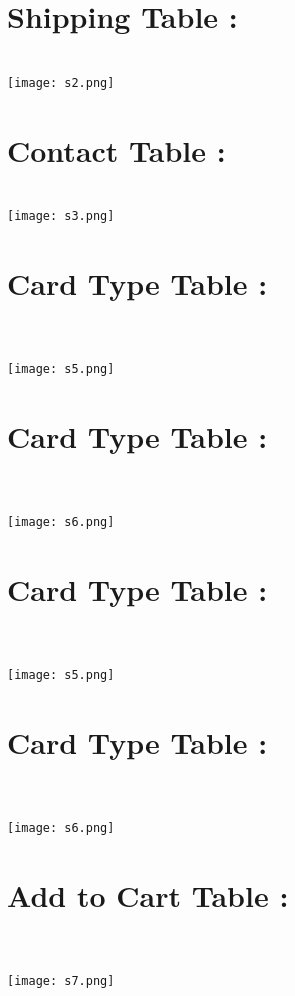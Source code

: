 \documentclass{article}
\begin{document}
\section*{Shipping Table : }
\\
\texttt{[image: s2.png]}
\section*{Contact Table : }
\\
\texttt{[image: s3.png]}
\section*{Card Type Table : }
\\
\\
\texttt{[image: s5.png]}
\section*{Card Type Table : }
\\
\\
\texttt{[image: s6.png]}
\section*{Card Type Table : }
\\
\\
\texttt{[image: s5.png]}
\section*{Card Type Table : }
\\
\\
\texttt{[image: s6.png]}
\section*{Add to Cart Table : }
\\
\\
\texttt{[image: s7.png]}
\end{document}
